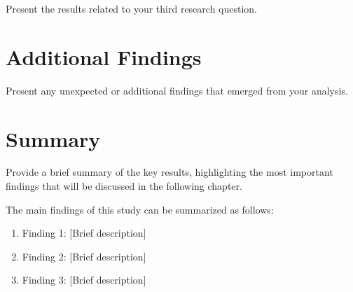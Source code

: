 Present the results related to your third research question.

\section{Additional Findings}

Present any unexpected or additional findings that emerged from your analysis.

\section{Summary}

Provide a brief summary of the key results, highlighting the most important findings that will be discussed in the following chapter.

The main findings of this study can be summarized as follows:

\begin{enumerate}
    \item Finding 1: [Brief description]
    \item Finding 2: [Brief description]
    \item Finding 3: [Brief description]
\end{enumerate}